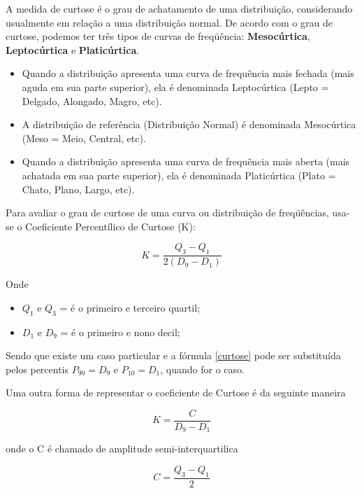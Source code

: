 \inic A medida de curtose é o grau de achatamento de uma distribuição, considerando usualmente em relação a uma distribuição normal. De acordo com o grau de curtose, podemos ter três tipos de curvas de freqüência: \textbf{Mesocúrtica}, \textbf{Leptocúrtica} e \textbf{Platicúrtica}.\vskip0.3cm

\begin{itemize}
\item Quando a distribuição apresenta uma curva de frequência mais fechada (mais aguda em sua parte superior), ela é denominada Leptocúrtica (Lepto = Delgado, Alongado, Magro, etc).
\item A distribuição de referência (Distribuição Normal) é denominada Mesocúrtica (Meso = Meio, Central, etc).
\item Quando a distribuição apresenta uma curva de frequência mais aberta (mais achatada em sua parte superior), ela é denominada Platicúrtica (Plato = Chato, Plano, Largo, etc).
\end{itemize}

Para avaliar o grau de curtose de uma curva ou distribuição de freqüências, usa-se o Coeficiente Percentílico de Curtose (K):

\begin{equation}\label{curtose}
    K=\frac{Q_{3}-Q_{1}}{2(D_{9}-D_{1})}
\end{equation}

Onde

\begin{itemize}
  \item $Q_{1}$ e $Q_{3}$  = é o primeiro e terceiro quartil;
  \item $D_{1}$ e $D_{9}$  = é o primeiro e nono decil;
   \end{itemize}

\vskip0.3cm

Sendo que existe um caso particular e a fórmula \ref{curtose} pode ser substituída
pelos percentis $P_{90}=D_{9}$ e $P_{10}=D_{1}$, quando for o caso.




\vskip0.3cm
Uma outra forma de representar o coeficiente de Curtose é da seguinte maneira

\begin{equation}\label{curtose2}
    K= \frac{C}{D_{9}-D_{1}}
\end{equation}

onde o C é chamado de amplitude semi-interquartilica

\begin{equation}\label{curtose2}
    C= \frac{Q_{3}-Q_{1}}{2}
\end{equation}


